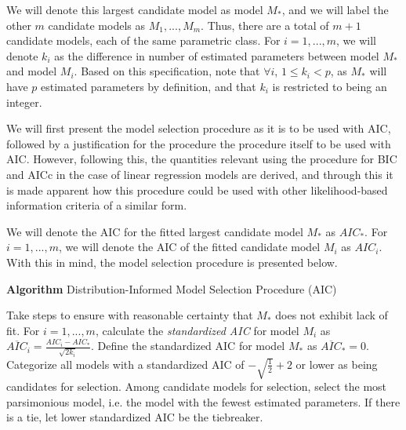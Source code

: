 		We will denote this largest candidate model as model $M_*$, and we will label the other $m$ candidate models as $M_1,...,M_m$. Thus, there are a total of $m+1$ candidate
		models, each of the same parametric class. For $i=1,...,m$, we will denote $k_i$ as the difference in number of estimated parameters between model $M_*$ and model
		$M_i$. Based on this specification, note that $\forall i$, $1 \le k_i < p$, as $M_*$ will have $p$ estimated parameters by definition, and that $k_i$ is restricted to
		being an integer.

		We will first present the model selection procedure as it is to be used with AIC, followed by a justification for the procedure the procedure itself to be used with
		AIC. However, following this, the quantities relevant using the procedure for BIC and AICc in the case of linear regression models are derived, and through this
		it is made apparent how this procedure could be used with other likelihood-based information criteria of a similar form.

		We will denote the AIC for the fitted largest candidate model $M_*$ as $AIC_*$. For $i=1,...,m$, we will denote the AIC of the fitted candidate model $M_i$ as 
		$AIC_i$. With this in mind, the model selection procedure is presented below.

		\pagebreak

		\begin{algorithm}
			\caption*{\textbf{Algorithm} Distribution-Informed Model Selection Procedure (AIC)}
			\begin{algorithmic}[1]
			  \State Take steps to ensure with reasonable certainty that $M_*$ does not exhibit lack of fit.
			  \State For $i = 1,...,m$, calculate the \textit{standardized AIC} for model $M_i$ as 
			  $\overline{AIC}_i = \frac{AIC_i - AIC_*}{\sqrt{2k_i}}$. Define the standardized AIC for model
			  $M_*$ as $\overline{AIC}_* = 0$.
			  \State Categorize all models with a standardized AIC of $ -\sqrt{\frac{1}{2}} + 2$ or lower as
			  being candidates for selection.
			  \State Among candidate models for selection, select the most parsimonious model, i.e. the model
			  with the fewest estimated parameters. If there is a tie, let lower standardized AIC be the
			  tiebreaker.
			\end{algorithmic}
		\end{algorithm}

